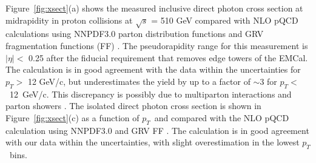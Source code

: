 \documentclass[twocolumn,letterpaper,aps,prl,longbibliography,superscriptaddress,floatfix]{revtex4-2}
\newcommand{\pT}{\ensuremath{p_T}}
\begin{document}
Figure~\ref{fig:xsect}(a) shows the measured inclusive direct photon cross section at midrapidity in proton collisions at $\sqrt{s}$ = 510 GeV compared with NLO pQCD calculations \cite{PhysRevD.48.3136, PhysRevD.50.1901} using NNPDF3.0 parton distribution functions \cite{Ball2015, Bonvini2015} and GRV fragmentation functions (FF) \cite{PhysRevD.45.3986}. The pseudorapidity range for this measurement is $|\eta| <$ 0.25 after the fiducial requirement that removes edge towers of the EMCal. The calculation is in good agreement with the data within the uncertainties for $p_T >$ 12 GeV/c, but underestimates the yield by up to a factor of $\sim$3 for \mbox{$p_T <$ 12 GeV/c}. This discrepancy is possibly due to multiparton interactions and parton showers \cite{Nason_2004, Frixione_2007, Alioli2010, Jezo2016, Klasen2018}. The isolated direct photon cross section is shown in Figure~\ref{fig:xsect}(c) as a function of \pT\ and compared with the NLO pQCD calculation \cite{PhysRevD.48.3136, PhysRevD.50.1901} using NNPDF3.0 \cite{Ball2015, Bonvini2015} and GRV FF \cite{PhysRevD.45.3986}. The calculation is in good agreement with our data within the uncertainties, with slight overestimation in the lowest \pT\ bins.
\end{document}
